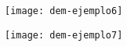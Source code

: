 \documentclass[14pt]{beamer}
\begin{document}
  \begin{frame}
 \begin{figure}
    \centering
    \texttt{[image: dem-ejemplo6]}
  \end{figure}
\end{frame}
  \begin{frame}
 \begin{figure}
    \centering
    \texttt{[image: dem-ejemplo7]}
  \end{figure}
\end{frame}
\end{document}
